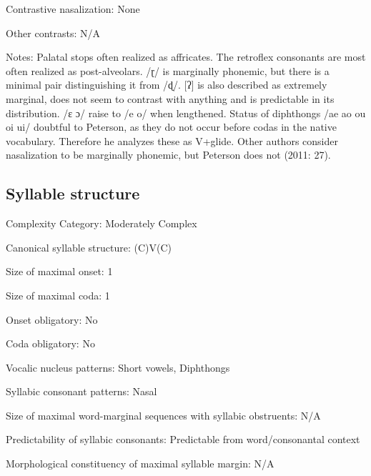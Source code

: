 {\begin{appendixdesc}
\item[Contrastive nasalization:] None

\item[Other contrasts:] N/A

\item[Notes:] Palatal stops often realized as affricates. The retroflex consonants are most often realized as post-alveolars. /ɽ/ is marginally phonemic, but there is a minimal pair distinguishing it from /ɖ/. [ʔ] is also described as extremely marginal, does not seem to contrast with anything and is predictable in its distribution. /ɛ ɔ/ raise to /e o/ when lengthened. Status of diphthongs /ae ao ou oi ui/ doubtful to Peterson, as they do not occur before codas in the native vocabulary. Therefore he analyzes these as V+glide. Other authors consider nasalization to be marginally phonemic, but Peterson does not (2011: 27).
\end{appendixdesc}
\subsection*{Syllable structure}
\begin{appendixdesc}

\item[Complexity Category:] Moderately Complex

\item[Canonical syllable structure:] (C)V(C) \citep[32--33]{Peterson2011}

\item[Size of maximal onset:] 1

\item[Size of maximal coda:] 1

\item[Onset obligatory:] No

\item[Coda obligatory:] No

\item[Vocalic nucleus patterns:] Short vowels, Diphthongs

\item[Syllabic consonant patterns:] Nasal

\item[Size of maximal word-marginal sequences with syllabic obstruents:] N/A

\item[Predictability of syllabic consonants:] Predictable from word/consonantal context

\item[Morphological constituency of maximal syllable margin:] N/A


\end{appendixdesc}}
